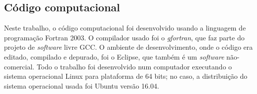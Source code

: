 
\subsection{Código computacional}\label{sobre_o_programa}

Neste trabalho, o código computacional foi desenvolvido usando a linguagem de programação Fortran 2003. O compilador usado foi o \textit{gfortran}, que faz parte do projeto de \textit{software} livre GCC. O ambiente de desenvolvimento, onde o código era editado, compilado e depurado, foi o Eclipse, que também é um \textit{software} não-comercial. Todo o trabalho foi desenvolvido num computador executando o sistema operacional Linux para plataforma de 64 bits; no caso, a distribuição do sistema operacional usada foi Ubuntu versão 16.04.

